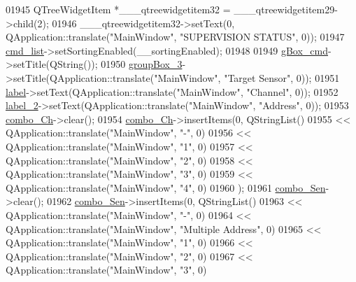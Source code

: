 \begin{DoxyCode}
01945         QTreeWidgetItem *\_\_\_qtreewidgetitem32 = \_\_\_qtreewidgetitem29->child(2);
01946         \_\_\_qtreewidgetitem32->setText(0, QApplication::translate(\textcolor{stringliteral}{"MainWindow"}, \textcolor{stringliteral}{"SUPERVISION STATUS"}, 0));
01947         \hyperlink{a00027_aa66ece71395b435e915d384fb63bac1d}{cmd\_list}->setSortingEnabled(\_\_sortingEnabled);
01948 
01949         \hyperlink{a00027_ad5c6667239e28060ba3b04ee0db97bac}{gBox\_cmd}->setTitle(QString());
01950         \hyperlink{a00027_a320d3d7ba1cb8fff7b7b95923ed10f5e}{groupBox\_3}->setTitle(QApplication::translate(\textcolor{stringliteral}{"MainWindow"}, \textcolor{stringliteral}{"Target Sensor"}, 0));
01951         \hyperlink{a00027_ad9c89133780f28e6efa2ec17ceb9cff5}{label}->setText(QApplication::translate(\textcolor{stringliteral}{"MainWindow"}, \textcolor{stringliteral}{"Channel"}, 0));
01952         \hyperlink{a00027_a2e2516d755e4dd53fc905dabddf2738a}{label\_2}->setText(QApplication::translate(\textcolor{stringliteral}{"MainWindow"}, \textcolor{stringliteral}{"Address"}, 0));
01953         \hyperlink{a00027_a263fb43f2eff37a44ff7359ba41e2eeb}{combo\_Ch}->clear();
01954         \hyperlink{a00027_a263fb43f2eff37a44ff7359ba41e2eeb}{combo\_Ch}->insertItems(0, QStringList()
01955          << QApplication::translate(\textcolor{stringliteral}{"MainWindow"}, \textcolor{stringliteral}{"-"}, 0)
01956          << QApplication::translate(\textcolor{stringliteral}{"MainWindow"}, \textcolor{stringliteral}{"1"}, 0)
01957          << QApplication::translate(\textcolor{stringliteral}{"MainWindow"}, \textcolor{stringliteral}{"2"}, 0)
01958          << QApplication::translate(\textcolor{stringliteral}{"MainWindow"}, \textcolor{stringliteral}{"3"}, 0)
01959          << QApplication::translate(\textcolor{stringliteral}{"MainWindow"}, \textcolor{stringliteral}{"4"}, 0)
01960         );
01961         \hyperlink{a00027_ad95005b5fcac8126171019298147b285}{combo\_Sen}->clear();
01962         \hyperlink{a00027_ad95005b5fcac8126171019298147b285}{combo\_Sen}->insertItems(0, QStringList()
01963          << QApplication::translate(\textcolor{stringliteral}{"MainWindow"}, \textcolor{stringliteral}{"-"}, 0)
01964          << QApplication::translate(\textcolor{stringliteral}{"MainWindow"}, \textcolor{stringliteral}{"Multiple Address"}, 0)
01965          << QApplication::translate(\textcolor{stringliteral}{"MainWindow"}, \textcolor{stringliteral}{"1"}, 0)
01966          << QApplication::translate(\textcolor{stringliteral}{"MainWindow"}, \textcolor{stringliteral}{"2"}, 0)
01967          << QApplication::translate(\textcolor{stringliteral}{"MainWindow"}, \textcolor{stringliteral}{"3"}, 0)

\end{DoxyCode}

